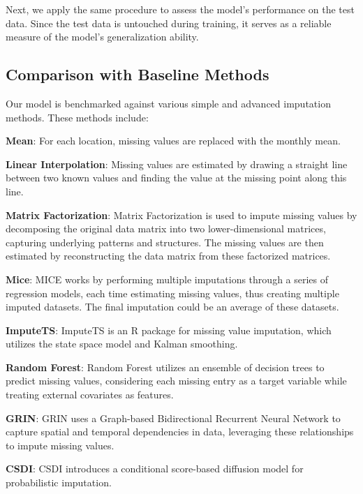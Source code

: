 \documentclass[11pt]{article}
\begin{document}
Next, we apply the same procedure to assess the model's performance on the test data. Since the test data is untouched during training, it serves as a reliable measure of the model's generalization ability.



\subsection{Comparison with Baseline Methods}
Our model is benchmarked against various simple and advanced imputation methods. These methods include:

\begin{description}
	\item \textbf{Mean}: For each location, missing values are replaced with the monthly mean.
	\item \textbf{Linear Interpolation}: Missing values are estimated by drawing a straight line between two known values and finding the value at the missing point along this line.
	\item \textbf{Matrix Factorization}: Matrix Factorization is used to impute missing values by decomposing the original data matrix into two lower-dimensional matrices, capturing underlying patterns and structures. The missing values are then estimated by reconstructing the data matrix from these factorized matrices.
	\item \textbf{Mice}: MICE \citep{white2011multiple} works by performing multiple imputations through a series of regression models, each time estimating missing values, thus creating multiple imputed datasets. The final imputation could be an average of these datasets.
	\item \textbf{ImputeTS}:  ImputeTS \citep{moritz2017imputets} is an R package for missing value imputation, which utilizes the state space model and Kalman smoothing.
	\item \textbf{Random Forest}: Random Forest \citep{breiman2001random} utilizes an ensemble of decision trees to predict missing values, considering each missing entry as a target variable while treating external covariates as features.
	\item \textbf{GRIN}: GRIN \citep{cini2021filling} uses a Graph-based Bidirectional Recurrent Neural Network to capture spatial and temporal dependencies in data, leveraging these relationships to impute missing values.
	\item \textbf{CSDI}: CSDI \citep{tashiro2021csdi} introduces a conditional score-based diffusion model for probabilistic imputation.
\end{description}
\end{document}
